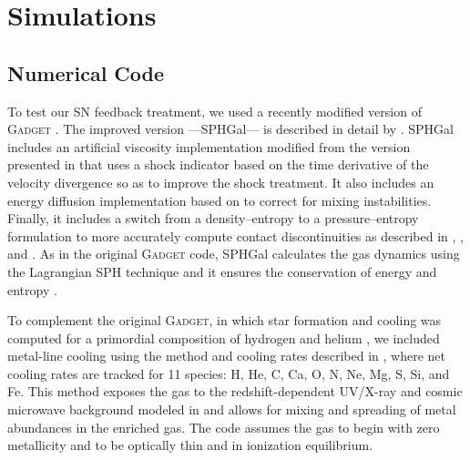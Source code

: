 \documentclass[iop]{emulateapj}
\begin{document}
\section{Simulations}\label{sec:sim}
\subsection{Numerical Code}\label{subsec:code}
To test our SN feedback treatment, we used a recently modified version of \textsc{Gadget} \citep{Springel05b}. The improved version ---SPHGal--- is described in detail by \citet{Hu14}. SPHGal includes an artificial viscosity implementation modified from the version presented in \citet{Cullen10} that uses a shock indicator based on the time derivative of the velocity divergence so as to improve the shock treatment. It also includes an energy diffusion implementation based on \citet{Read12} to correct for mixing instabilities. Finally, it includes a switch from a density--entropy to a pressure--entropy formulation to more accurately compute contact discontinuities as described in \citet{Hopkins2013a}, \citet{Ritchie01}, and \citet{Saitoh13}. As in the original \textsc{Gadget} code, SPHGal calculates the gas dynamics using the Lagrangian SPH technique \citep[see e.g.,][]{Monaghan92} and it ensures the conservation of energy and entropy \citep{Springel02}.

To complement the original \textsc{Gadget}, in which star formation and cooling was computed for a primordial composition of hydrogen and helium \citep{Katz96}, we included metal-line cooling using the method and cooling rates described in \citet{Aumer13}, where net cooling rates are tracked for 11 species: H, He, C, Ca, O, N, Ne, Mg, S, Si, and Fe. This method exposes the gas to the redshift-dependent UV/X-ray and cosmic microwave background modeled in \citet{Haardt01} and allows for mixing and spreading of metal abundances in the enriched gas. The code assumes the gas to begin with zero metallicity and to be optically thin and in ionization equilibrium.
\end{document}
